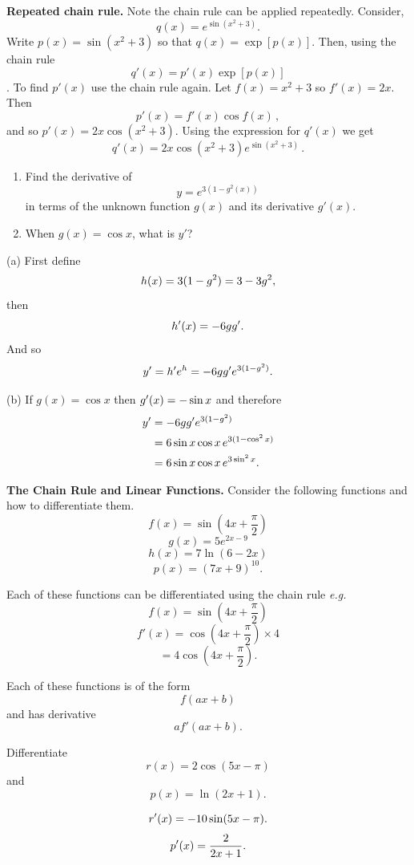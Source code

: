 \textbf{Repeated chain rule.} Note the chain rule can be applied repeatedly. Consider,
\[
q(x)=e^{\sin(x^2+3)}.
\]
Write $p(x)=\sin(x^2+3)$ so that $q(x)=\exp[p(x)]$. Then, using the chain rule 
\[
q'(x)=p'(x)\exp[p(x)]
\]. 
To find $p'(x)$ use the chain rule again. Let $f(x)=x^2+3$ so $f'(x)=2x$. Then 
\[
p'(x)=f'(x)\cos f(x) \, ,
\]
and so $p'(x)=2x\cos(x^2+3)$. Using the expression for $q'(x)$ we get
\[
q'(x)=2x\cos(x^2+3)e^{\sin(x^2+3)}\, .
\]

\goodbreak
\begin{example}[Video]
\begin{enumerate}[label=(\alph*)]
    \item Find the derivative of
            \[
            y=e^{3(1-g^2(x))}
            \]
    in terms of the unknown function $g(x)$ and its derivative $g'(x)$.
    \item When $g(x)=\cos x$, what is $y'$?
\end{enumerate}
\end{example}
%
\begin{solution}
(a) First define
\[
h(x)=3(1-g^2)=3-3g^2,
\]
then
\[
h'(x)=-6gg'.
\]
And so
\[
y'=h'e^h=-6gg'e^{3(1-g^2)}.
\]

(b) If $g(x)=\cos x$ then $g'(x)=-\sin x$ and therefore
\begin{align*}
y'&=-6gg'e^{3(1-g^2)}\\
&=6\sin x\cos x\,e^{3(1-\cos^2x)}\\
&=6\sin x\cos x\,e^{3\sin^2x}.
\end{align*}
\end{solution}

\textbf{The Chain Rule and Linear Functions.} Consider the following functions and how to differentiate them.
\[
f(x)=\sin\left(4x+\frac{\pi}{2}\right)
\]
\[
g(x)=5e^{2x-9}
\]
\[
h(x)=7\ln(6-2x)
\]
\[
p(x)=(7x+9)^{10}.
\]

Each of these functions can be differentiated using the chain rule \textit{e.g.}
\[
f(x)=\sin\left(4x+\frac{\pi}{2}\right)
\]
\[
f'(x)=\cos\left(4x+\frac{\pi}{2}\right)\times4
\]
\[
=4\cos\left(4x+\frac{\pi}{2}\right).
\]

Each of these functions is of the form
\[
f(ax+b)
\]
and has derivative
\[
af'(ax+b).
\]

\goodbreak
\begin{example}[Lecture]
Differentiate
\[
r(x)=2\cos(5x-\pi)
\]
and
\[
p(x)=\ln(2x+1).
\]
\end{example}
%
\begin{solution}
\[
r'(x)=-10\sin(5x-\pi).
\]
\[
p'(x)=\frac{2}{2x+1}.
\]
\end{solution}

